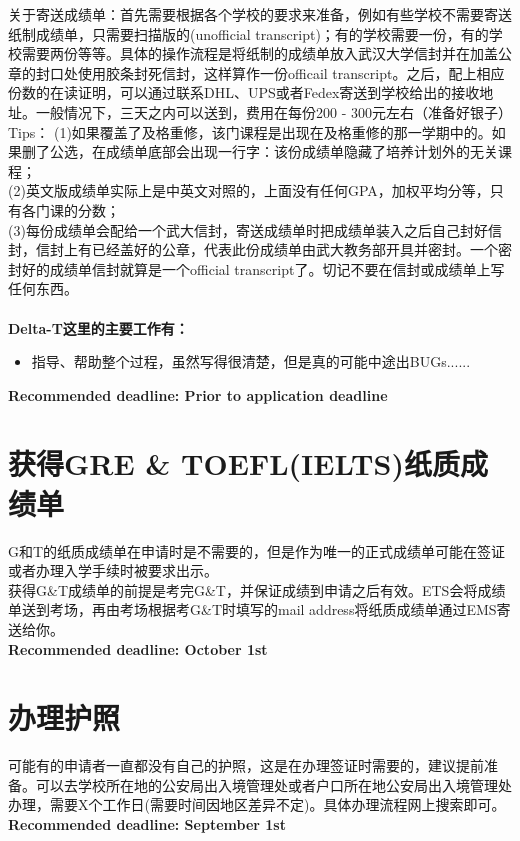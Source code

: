 \documentclass{article}
\begin{document}
\textcolor{colorname2}{关于寄送成绩单}：首先需要根据各个学校的要求来准备，例如有些学校不需要寄送纸制成绩单，只需要扫描版的(unofficial transcript)；有的学校需要一份，有的学校需要两份等等。具体的操作流程是将纸制的成绩单放入武汉大学信封并在加盖公章的封口处使用胶条封死信封，这样算作一份officail transcript。之后，配上相应份数的在读证明，可以通过联系DHL、UPS或者Fedex寄送到学校给出的接收地址。一般情况下，三天之内可以送到，费用在每份200 - 300元左右（准备好银子）\\
\textcolor{colorname2}{Tips}：
(1)如果覆盖了及格重修，该门课程是出现在及格重修的那一学期中的。如果删了公选，在成绩单底部会出现一行字：该份成绩单隐藏了培养计划外的无关课程；\\
(2)英文版成绩单实际上是中英文对照的，上面没有任何GPA，加权平均分等，只有各门课的分数；\\
(3)每份成绩单会配给一个武大信封，寄送成绩单时把成绩单装入之后自己封好信封，信封上有已经盖好的公章，代表此份成绩单由武大教务部开具并密封。一个密封好的成绩单信封就算是一个official transcript了。切记不要在信封或成绩单上写任何东西。\\
\\
\indent\textcolor{colorname2}{\bf Delta-T这里的主要工作有：}
\begin{itemize}
\item{指导、帮助整个过程，虽然写得很清楚，但是真的可能中途出BUGs......}
\end{itemize}
\textbf{Recommended deadline: Prior to application deadline}

\section{获得GRE \& TOEFL(IELTS)纸质成绩单}
G和T的纸质成绩单在申请时是不需要的，但是作为唯一的正式成绩单可能在签证或者办理入学手续时被要求出示。\\
\indent 获得G\&T成绩单的前提是考完G\&T，并保证成绩到申请之后有效。ETS会将成绩单送到考场，再由考场根据考G\&T时填写的mail address将纸质成绩单通过EMS寄送给你。\\
\textbf{Recommended deadline: October 1st}

\section{办理护照}
可能有的申请者一直都没有自己的护照，这是在办理签证时需要的，建议提前准备。可以去学校所在地的公安局出入境管理处或者户口所在地公安局出入境管理处办理，需要X个工作日(需要时间因地区差异不定)。具体办理流程网上搜索即可。\\
\textbf{Recommended deadline: September 1st}
\end{document}
